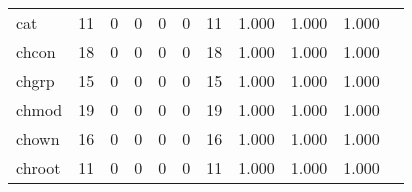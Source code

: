 \begin{longtable}{lp{1.2cm}p{1.2cm}p{1.2cm}p{1.2cm}p{1.2cm}p{1.2cm}p{1.2cm}p{1.2cm}p{1.2cm}p{1.2cm}}
cat       &                                    11 &                                                  0 &                                                  0 &                                                  0 &                                                  0 &                                                 11 &                                         1.000 &                                              1.000 &                                              1.000 \\
chcon     &                                    18 &                                                  0 &                                                  0 &                                                  0 &                                                  0 &                                                 18 &                                         1.000 &                                              1.000 &                                              1.000 \\
chgrp     &                                    15 &                                                  0 &                                                  0 &                                                  0 &                                                  0 &                                                 15 &                                         1.000 &                                              1.000 &                                              1.000 \\
chmod     &                                    19 &                                                  0 &                                                  0 &                                                  0 &                                                  0 &                                                 19 &                                         1.000 &                                              1.000 &                                              1.000 \\
chown     &                                    16 &                                                  0 &                                                  0 &                                                  0 &                                                  0 &                                                 16 &                                         1.000 &                                              1.000 &                                              1.000 \\
chroot    &                                    11 &                                                  0 &                                                  0 &                                                  0 &                                                  0 &                                                 11 &                                         1.000 &                                              1.000 &                                              1.000 \\

\end{longtable}
